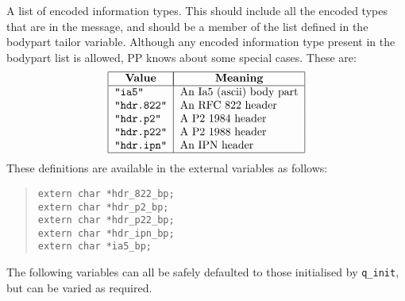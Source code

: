 \begin{describe}
\item[\verb|encodedinfo|:]	A list of encoded information types.
This should include all the encoded types that are in the message, and
should be a member of the list defined in the bodypart tailor
variable.
Although any encoded information type present in the bodypart list is
allowed, PP knows about some special cases. These are:
\[\begin{tabular}{|l|l|}
\hline
	\multicolumn{1}{|c|}{\bf Value}&
		\multicolumn{1}{|c|}{\bf Meaning}\\
\hline
	\tt "ia5"&	An Ia5 (ascii) body part\\
	\tt "hdr.822"&	An RFC~822 header\\
	\tt "hdr.p2" &	A P2 1984 header \\
	\tt "hdr.p22" & A P2 1988 header \\
	\tt "hdr.ipn" & An IPN header \\
\hline
\end{tabular}\]
These definitions are available in the external variables as follows:
\begin{quote}\small\begin{verbatim}
extern char *hdr_822_bp;
extern char *hdr_p2_bp;
extern char *hdr_p22_bp;
extern char *hdr_ipn_bp;
extern char *ia5_bp;
\end{verbatim}\end{quote}
\end{describe}

The following variables can all be safely defaulted to those
initialised by \verb|q_init|, but can be varied as required.

